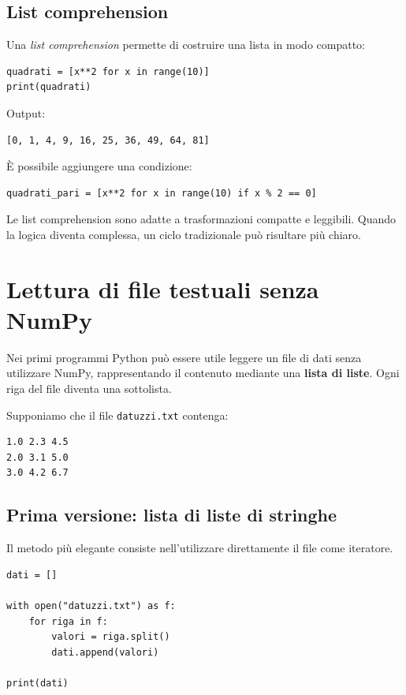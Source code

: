 \documentclass[11pt,a4paper]{book}
\begin{document}
\subsection{List comprehension}

Una \emph{list comprehension} permette di costruire una lista in modo compatto:

\begin{lstlisting}[style=python]
quadrati = [x**2 for x in range(10)]
print(quadrati)
\end{lstlisting}

Output:

\begin{lstlisting}[style=python, numbers=none]
[0, 1, 4, 9, 16, 25, 36, 49, 64, 81]
\end{lstlisting}

È possibile aggiungere una condizione:

\begin{lstlisting}[style=python]
quadrati_pari = [x**2 for x in range(10) if x % 2 == 0]
\end{lstlisting}

Le list comprehension sono adatte a trasformazioni compatte e leggibili. Quando la logica diventa complessa, un ciclo tradizionale può risultare più chiaro.

\section{Lettura di file testuali senza NumPy}

Nei primi programmi Python può essere utile leggere un file di dati senza utilizzare NumPy, rappresentando il contenuto mediante una \textbf{lista di liste}. Ogni riga del file diventa una sottolista.

Supponiamo che il file \texttt{datuzzi.txt} contenga:

\begin{lstlisting}[style=output]
1.0 2.3 4.5
2.0 3.1 5.0
3.0 4.2 6.7
\end{lstlisting}

\subsection{Prima versione: lista di liste di stringhe}

Il metodo più elegante consiste nell'utilizzare direttamente il file come iteratore.

\begin{lstlisting}[style=python]
dati = []

with open("datuzzi.txt") as f:
    for riga in f:
        valori = riga.split()
        dati.append(valori)

print(dati)
\end{lstlisting}
\end{document}
